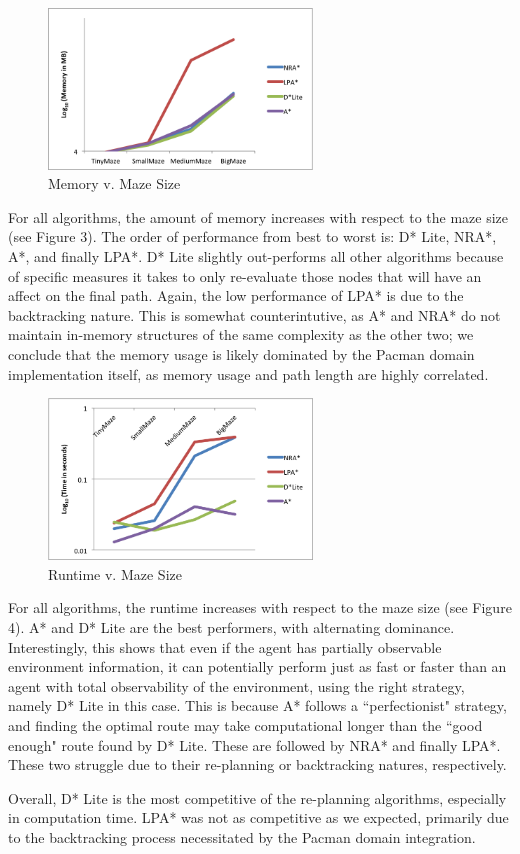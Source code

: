 	\begin{figure}[t]
		\centering
		\includegraphics[width=7cm]{Memory.png}
		\caption{Memory v. Maze Size}
		\label{fig:3}
	\end{figure}

	For all algorithms, the amount of memory increases with respect to the maze size (see Figure 3). The order of performance from best to worst is: D* Lite, NRA*, A*, and finally LPA*. D* Lite slightly out-performs all other algorithms because of specific measures it takes to only re-evaluate those nodes that will have an affect on the final path. Again, the low performance of LPA* is due to the backtracking nature. This is somewhat counterintutive, as A* and NRA* do not maintain in-memory structures of the same complexity as the other two; we conclude that the memory usage is likely dominated by the Pacman domain implementation itself, as memory usage and path length are highly correlated.

	\begin{figure}[t]
		\centering
		\includegraphics[width=7cm]{Time.png}
		\caption{Runtime v. Maze Size}
		\label{fig:4}
	\end{figure}

	For all algorithms, the runtime  increases with respect to the maze size (see Figure 4). A* and D* Lite are the best performers, with alternating dominance. Interestingly, this shows that even if the agent has partially observable environment information, it can potentially perform just as fast or faster than an agent with total observability of the environment, using the right strategy, namely D* Lite in this case. This is because A* follows a ``perfectionist" strategy, and finding the optimal route may take computational longer than the ``good enough" route found by D* Lite. These are followed by NRA* and finally LPA*. These two struggle due to their re-planning or backtracking natures, respectively.
	
	Overall, D* Lite is the most competitive of the re-planning algorithms, especially in computation time. LPA* was not as competitive as we expected, primarily due to the backtracking process necessitated by the Pacman domain integration.
